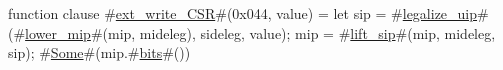 function clause #\hyperref[sailRISCVzextzywritezyCSR]{ext\_write\_CSR}#(0x044, value) = { let sip = #\hyperref[sailRISCVzlegalizzezyuip]{legalize\_uip}#(#\hyperref[sailRISCVzlowerzymip]{lower\_mip}#(mip, mideleg), sideleg, value);
                                                 mip = #\hyperref[sailRISCVzliftzysip]{lift\_sip}#(mip, mideleg, sip);
                                                 #\hyperref[sailRISCVzSome]{Some}#(mip.#\hyperref[sailRISCVzbits]{bits}#()) }
